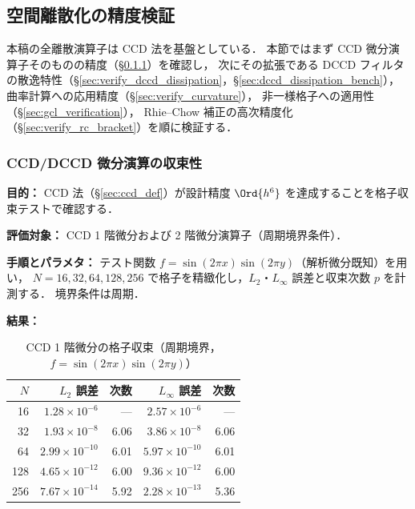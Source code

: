 %
\subsection{空間離散化の精度検証}
\label{sec:verify_spatial}

本稿の全離散演算子は CCD 法を基盤としている．
本節ではまず CCD 微分演算子そのものの精度（§\ref{sec:verify_ccd_convergence}）を確認し，
次にその拡張である DCCD フィルタの散逸特性（§\ref{sec:verify_dccd_dissipation}，§\ref{sec:dccd_dissipation_bench}），
曲率計算への応用精度（§\ref{sec:verify_curvature}），
非一様格子への適用性（§\ref{sec:gcl_verification}），
Rhie--Chow 補正の高次精度化（§\ref{sec:verify_rc_bracket}）を順に検証する．

\subsubsection{CCD/DCCD 微分演算の収束性}
\label{sec:verify_ccd_convergence}

\noindent\textbf{目的：}
CCD 法（§\ref{sec:ccd_def}）が設計精度 $\Ord{h^6}$ を達成することを格子収束テストで確認する．

\noindent\textbf{評価対象：}
CCD 1 階微分および 2 階微分演算子（周期境界条件）．

\noindent\textbf{手順とパラメタ：}
テスト関数 $f = \sin(2\pi x)\sin(2\pi y)$（解析微分既知）を用い，
$N = 16, 32, 64, 128, 256$ で格子を精緻化し，$L_2$・$L_\infty$ 誤差と収束次数 $p$ を計測する．
境界条件は周期．

\noindent\textbf{結果：}

\begin{table}[htbp]
\centering
\caption{CCD 1 階微分の格子収束（周期境界，$f = \sin(2\pi x)\sin(2\pi y)$）}
\label{tab:ccd_periodic}
\renewcommand{\arraystretch}{1.3}
\begin{tabular}{rrrrr}
\toprule
$N$ & $L_2$ 誤差 & 次数 & $L_\infty$ 誤差 & 次数 \\
\midrule
 16 & $1.28 \times 10^{-6}$  & ---  & $2.57 \times 10^{-6}$  & ---  \\
 32 & $1.93 \times 10^{-8}$  & 6.06 & $3.86 \times 10^{-8}$  & 6.06 \\
 64 & $2.99 \times 10^{-10}$ & 6.01 & $5.97 \times 10^{-10}$ & 6.01 \\
128 & $4.65 \times 10^{-12}$ & 6.00 & $9.36 \times 10^{-12}$ & 6.00 \\
256 & $7.67 \times 10^{-14}$ & 5.92 & $2.28 \times 10^{-13}$ & 5.36 \\
\bottomrule
\end{tabular}
\end{table}

